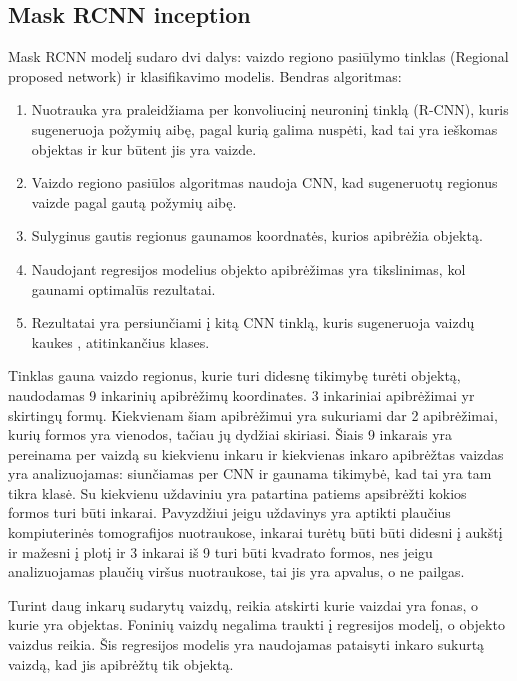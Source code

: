 \documentclass{VUMIFInfKursinis}
\begin{document}
\subsection{Mask RCNN inception}
\par
Mask RCNN modelį sudaro dvi dalys: vaizdo regiono pasiūlymo tinklas (Regional proposed network) ir
klasifikavimo modelis. Bendras algoritmas:
\begin{enumerate}
\item Nuotrauka yra praleidžiama per konvoliucinį neuroninį tinklą (R-CNN), kuris
sugeneruoja požymių aibę, pagal kurią galima nuspėti, kad tai yra ieškomas objektas
ir kur būtent jis yra vaizde.
\item Vaizdo regiono pasiūlos algoritmas naudoja CNN, kad sugeneruotų regionus vaizde pagal
gautą požymių aibę.
\item Sulyginus gautis regionus gaunamos koordnatės, kurios apibrėžia objektą.
\item Naudojant regresijos modelius objekto apibrėžimas yra tikslinimas, kol gaunami
optimalūs rezultatai.
\item Rezultatai yra persiunčiami į kitą CNN tinklą, kuris sugeneruoja vaizdų kaukes
, atitinkančius klases.
\end{enumerate}
\par
Tinklas gauna vaizdo regionus, kurie turi didesnę tikimybę turėti objektą, naudodamas
9 inkarinių apibrėžimų koordinates.
3 inkariniai apibrėžimai yr skirtingų formų. Kiekvienam šiam apibrėžimui yra sukuriami
dar 2 apibrėžimai, kurių formos yra vienodos, tačiau jų dydžiai skiriasi. Šiais 9
inkarais yra pereinama per vaizdą su kiekvienu inkaru ir kiekvienas inkaro apibrėžtas
vaizdas yra analizuojamas: siunčiamas per CNN ir gaunama tikimybė, kad tai yra tam tikra
klasė. Su kiekvienu uždaviniu yra patartina patiems apsibrėžti kokios formos turi būti inkarai.
Pavyzdžiui jeigu uždavinys yra aptikti plaučius kompiuterinės tomografijos nuotraukose,
inkarai turėtų būti būti didesni į aukštį ir mažesni į plotį ir 3 inkarai iš 9 turi būti
kvadrato formos, nes jeigu analizuojamas plaučių viršus nuotraukose, tai jis yra apvalus,
o ne pailgas.
\par
Turint daug inkarų sudarytų vaizdų, reikia atskirti kurie vaizdai yra fonas, o kurie
yra objektas. Foninių vaizdų negalima traukti į regresijos modelį, o objekto vaizdus reikia.
Šis regresijos modelis yra naudojamas pataisyti inkaro sukurtą vaizdą, kad jis apibrėžtų tik
objektą.
\par
\end{document}
